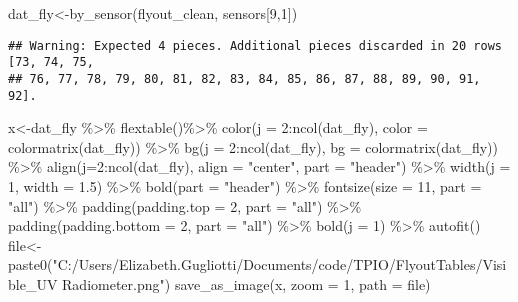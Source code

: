 \documentclass[
]{article}
\newenvironment{Shaded}{\begin{snugshade}}{\end{snugshade}}
\newcommand{\AttributeTok}[1]{\textcolor[rgb]{0.77,0.63,0.00}{#1}}
\newcommand{\DecValTok}[1]{\textcolor[rgb]{0.00,0.00,0.81}{#1}}
\newcommand{\FloatTok}[1]{\textcolor[rgb]{0.00,0.00,0.81}{#1}}
\newcommand{\FunctionTok}[1]{\textcolor[rgb]{0.00,0.00,0.00}{#1}}
\newcommand{\NormalTok}[1]{#1}
\newcommand{\OtherTok}[1]{\textcolor[rgb]{0.56,0.35,0.01}{#1}}
\newcommand{\SpecialCharTok}[1]{\textcolor[rgb]{0.00,0.00,0.00}{#1}}
\newcommand{\StringTok}[1]{\textcolor[rgb]{0.31,0.60,0.02}{#1}}
\begin{document}
\begin{Shaded}
\begin{Highlighting}[]
\NormalTok{dat\_fly}\OtherTok{\textless{}{-}}\FunctionTok{by\_sensor}\NormalTok{(flyout\_clean, sensors[}\DecValTok{9}\NormalTok{,}\DecValTok{1}\NormalTok{])}
\end{Highlighting}
\end{Shaded}

\begin{verbatim}
## Warning: Expected 4 pieces. Additional pieces discarded in 20 rows [73, 74, 75,
## 76, 77, 78, 79, 80, 81, 82, 83, 84, 85, 86, 87, 88, 89, 90, 91, 92].
\end{verbatim}

\begin{Shaded}
\begin{Highlighting}[]
\NormalTok{x}\OtherTok{\textless{}{-}}\NormalTok{dat\_fly }\SpecialCharTok{\%\textgreater{}\%}
    \FunctionTok{flextable}\NormalTok{()}\SpecialCharTok{\%\textgreater{}\%}
    \FunctionTok{color}\NormalTok{(}\AttributeTok{j =} \DecValTok{2}\SpecialCharTok{:}\FunctionTok{ncol}\NormalTok{(dat\_fly), }\AttributeTok{color =} \FunctionTok{colormatrix}\NormalTok{(dat\_fly)) }\SpecialCharTok{\%\textgreater{}\%}
    \FunctionTok{bg}\NormalTok{(}\AttributeTok{j =} \DecValTok{2}\SpecialCharTok{:}\FunctionTok{ncol}\NormalTok{(dat\_fly), }\AttributeTok{bg =} \FunctionTok{colormatrix}\NormalTok{(dat\_fly)) }\SpecialCharTok{\%\textgreater{}\%}
    \FunctionTok{align}\NormalTok{(}\AttributeTok{j=}\DecValTok{2}\SpecialCharTok{:}\FunctionTok{ncol}\NormalTok{(dat\_fly), }\AttributeTok{align =} \StringTok{"center"}\NormalTok{, }\AttributeTok{part =} \StringTok{"header"}\NormalTok{) }\SpecialCharTok{\%\textgreater{}\%}
    \FunctionTok{width}\NormalTok{(}\AttributeTok{j =} \DecValTok{1}\NormalTok{, }\AttributeTok{width =} \FloatTok{1.5}\NormalTok{) }\SpecialCharTok{\%\textgreater{}\%}
    \FunctionTok{bold}\NormalTok{(}\AttributeTok{part =} \StringTok{"header"}\NormalTok{) }\SpecialCharTok{\%\textgreater{}\%}
    \FunctionTok{fontsize}\NormalTok{(}\AttributeTok{size =} \DecValTok{11}\NormalTok{, }\AttributeTok{part =} \StringTok{"all"}\NormalTok{) }\SpecialCharTok{\%\textgreater{}\%}
    \FunctionTok{padding}\NormalTok{(}\AttributeTok{padding.top =} \DecValTok{2}\NormalTok{, }\AttributeTok{part =} \StringTok{"all"}\NormalTok{) }\SpecialCharTok{\%\textgreater{}\%}
    \FunctionTok{padding}\NormalTok{(}\AttributeTok{padding.bottom =} \DecValTok{2}\NormalTok{, }\AttributeTok{part =} \StringTok{"all"}\NormalTok{) }\SpecialCharTok{\%\textgreater{}\%}
    \FunctionTok{bold}\NormalTok{(}\AttributeTok{j =} \DecValTok{1}\NormalTok{) }\SpecialCharTok{\%\textgreater{}\%} \FunctionTok{autofit}\NormalTok{()}
\NormalTok{file}\OtherTok{\textless{}{-}}\FunctionTok{paste0}\NormalTok{(}\StringTok{"C:/Users/Elizabeth.Gugliotti/Documents/code/TPIO/FlyoutTables/Visible\_UV Radiometer.png"}\NormalTok{)}
\FunctionTok{save\_as\_image}\NormalTok{(x, }\AttributeTok{zoom =} \DecValTok{1}\NormalTok{, }\AttributeTok{path =}\NormalTok{ file)}
\end{Highlighting}
\end{Shaded}
\end{document}
